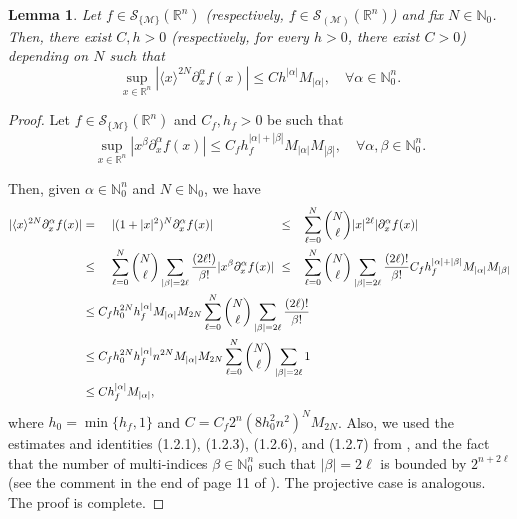 \documentclass[11pt,reqno]{amsart}
\numberwithin{equation}{section}
\newtheorem{lemma}[theorem]{Lemma}
\newcommand{\R}{{\mathbb{R}}} %
\newcommand{\N}{{\mathbb{N}}} %
\newcommand{\caS}{{\mathcal{S}}}
\newcommand{\M}{{\mathcal{M}}} %
\begin{document}
\begin{lemma}\label{est_GS_bracket}
	Let $f\in\caS_{\{\M\}}(\R^n)$ (respectively, $f\in\caS_{(\M)}(\R^n)$) and fix $N\in\N_0$. Then, there exist $C,h>0$ (respectively, for every $h>0$, there exist $C>0$) depending on $N$ such that
	\[\sup_{x\in \R^n}|\langle x\rangle^{2N}\partial_x^\alpha f(x)|\leq Ch^{|\alpha|}M_{|\alpha|},\quad\forall \alpha\in\N_0^n.\]
\end{lemma}
%
\begin{proof}
	Let $f\in\caS_{\{\M\}}(\R^n)$ and $C_f,h_f>0$ be such that
	\[\sup_{x\in\R^n}|x^\beta\partial_x^\alpha f(x)|\leq C_fh_f^{|\alpha|+|\beta|}M_{|\alpha|}M_{|\beta|},\quad\forall \alpha,\beta\in\mathbb{N}_0^n.\]
	
	Then, given $\alpha\in\mathbb{N}_0^n$ and $N\in\mathbb{N}_0$, we have
	\begin{align*}
		|\langle x\rangle^{2N}\partial_x^\alpha f(x)| & 
		= \hspace{4mm} |(1+|x|^2)^N\partial_x^\alpha f(x)|
		&& 
		\hspace{-13mm} \leq \hspace{3mm}
		\sum_{\ell=0}^N\binom{N}{\ell}|x|^{2\ell}|\partial_x^\alpha f(x)|\\
		& \leq \hspace{4mm} \sum_{\ell=0}^N\binom{N}{\ell}\sum_{|\beta|=2\ell}\frac{(2\ell!)}{\beta!}|x^\beta\partial_x^\alpha f(x)|
		&& \hspace{-13mm}
		\leq  \hspace{3mm}
		\sum_{\ell=0}^N\binom{N}{\ell}\sum_{|\beta|=2\ell}\frac{(2\ell)!}{\beta!}C_fh_f^{|\alpha|+|\beta|} M_{|\alpha|}M_{|\beta|}\\
		& \leq C_f h_0^{2N} h_f^{|\alpha|}M_{|\alpha|}M_{2N}\sum_{\ell=0}^N\binom{N}{\ell}\sum_{|\beta|=2\ell}\frac{(2\ell)!}{\beta!}\\
		& \leq C_f h_0^{2N} h_f^{|\alpha|}n^{2N}M_{|\alpha|}M_{2N} \sum_{\ell=0}^N\binom{N}{\ell}\sum_{|\beta|=2\ell} 1\\
		& \leq C h_f^{|\alpha|}M_{|\alpha|},
	\end{align*}
	where $h_0=\min\{h_f,1\}$ and $C= C_f2^n(8h_0^2n^2)^N M_{2N}$. Also, we used the estimates and identities (1.2.1), (1.2.3), (1.2.6), and (1.2.7) from \cite{Rod_Gevrey}, and the fact that the number of multi-indices $\beta \in \mathbb{N}_0^n$ such that $|\beta|=2\ell$ is bounded by $2^{n+2\ell}$ (see the comment in the end of page 11 of \cite{Rod_Gevrey}). The projective case is analogous. The proof is complete.
\end{proof}
\end{document}
